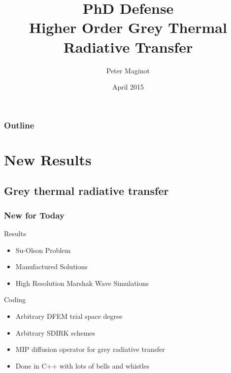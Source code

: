 \documentclass{beamer}
\title{PhD Defense \\ Higher Order Grey Thermal Radiative Transfer}
\author{Peter Maginot}\institute{Texas A\&M University- Department of Nuclear Engineering}
\date{April 2015}
\newif\ifplacelogo %
\begin{document}
\placelogotrue
\begin{frame}
\titlepage


\end{frame}


\placelogofalse
\begin{frame}
\frametitle{Outline}
\tableofcontents[hideallsubsections]
\end{frame}

\section{New Results}

\subsection{Grey thermal radiative transfer}
\begin{frame}
\frametitle{New for Today}
Results
\begin{itemize}
\item Su-Olson Problem
\item Manufactured Solutions
\item High Resolution Marshak Wave Simulations
\end{itemize}
Coding
\begin{itemize}
\item Arbitrary DFEM trial space degree
\item Arbitrary SDIRK schemes
\item MIP diffusion operator for grey radiative transfer
\item Done in C++ with lots of bells and whistles
\end{itemize}
\end{frame}
\end{document}
